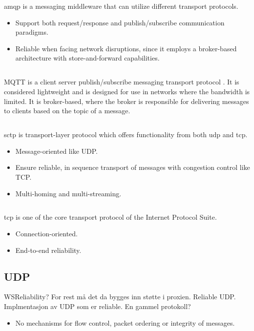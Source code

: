 \gls{amqp} is a messaging middleware that can utilize different transport
protocols.

\begin{itemize}
    \item Support both request/response and publish/subscribe communication
    paradigms.
    \item Reliable when facing network disruptions, since it employs a
    broker-based architecture with store-and-forward capabilities.
\end{itemize}

\subsection{}

MQTT is a client server publish/subscribe messaging transport protocol
\cite{oasis-mqtt}. It is considered lightweight and is designed for use in networks
where the bandwidth is limited. It is broker-based, where the broker is
responsible for delivering messages to clients based on the topic of a
message.

\subsection{}

\gls{sctp} is transport-layer protocol which offers functionality from both \gls{udp} and \gls{tcp}.
\begin{itemize}
    \item Message-oriented like UDP.
    \item Ensure reliable, in sequence transport of messages with congestion control like TCP.
    \item Multi-homing and multi-streaming.
\end{itemize}


\subsection{}
\gls{tcp} is one of the core transport protocol of the Internet Protocol Suite.
\begin{itemize}
    \item Connection-oriented.
    \item End-to-end reliability.
\end{itemize}

\subsection{UDP}
WSReliability? For rest må det da bygges inn støtte i proxien.
Reliable UDP. Implmentasjon av UDP som er reliable. En gammel protokoll?
\begin{itemize}
    \item No mechanisms for flow control, packet ordering or integrity of
    messages.
\end{itemize}

